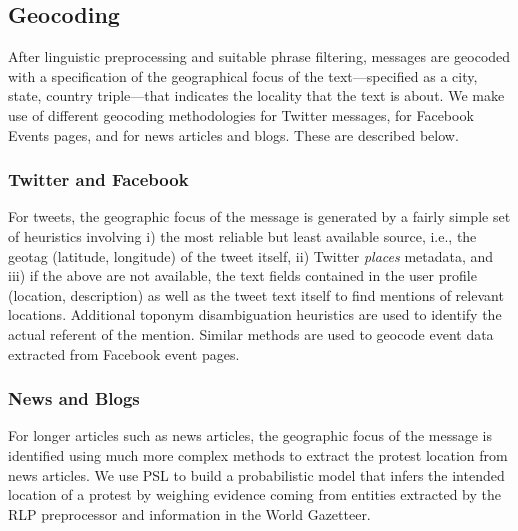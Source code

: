 \documentclass[letterpaper]{article}
\begin{document}
\subsection{Geocoding}
\label{subsection:geocoding}
After linguistic preprocessing and suitable phrase filtering,
messages are geocoded with a
specification of the geographical focus of the text---specified as a
city, state, country triple---that indicates the locality that the
text is about. We make use of different geocoding methodologies
for Twitter messages, for Facebook Events pages, and for news articles and blogs.
These are described below.

\subsubsection{Twitter and Facebook}
For tweets, the geographic focus of the message is generated by a fairly simple
set of heuristics involving i) the most reliable but least available
source, i.e., the geotag (latitude, longitude) of the tweet itself, ii)
Twitter {\it places} metadata, and iii) if the above are not available,
the text fields contained in the user profile (location, description) as
well as the tweet text itself to find mentions of relevant locations.
Additional toponym disambiguation heuristics are used to identify the
actual referent of the mention.  Similar methods are used to geocode
event data extracted from Facebook event pages.  

\subsubsection{News and Blogs}
For longer articles such as news articles, the geographic focus of the message
is identified using much more complex methods to extract the protest
location from news articles. We use PSL to build a probabilistic model
that infers the intended location of a protest by weighing evidence
coming from entities extracted by the RLP preprocessor and information in the World
Gazetteer. 
\end{document}
